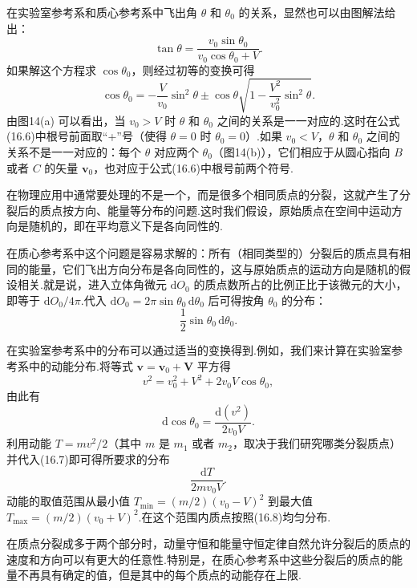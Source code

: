 在实验室参考系和质心参考系中飞出角 $\theta$ 和 $\theta_0$ 的关系，显然也可以由图解法给出：
\begin{equation}
  \tan\theta=\frac{v_0\sin\theta_0}{v_0\cos\theta_0+V}.
\end{equation}
如果解这个方程求 $\cos\theta_0$，则经过初等的变换可得
\begin{equation}
  \cos\theta_0=-\frac{V}{v_0}\sin^2\theta
  \pm\cos\theta\sqrt{1-\frac{V^2}{v_0^2}\sin^2\theta}.
\end{equation}
由图14(a) 可以看出，当 $v_0>V$ 时 $\theta$ 和 $\theta_0$ 之间的关系是一一对应的.这时在公式(16.6)中根号前面取“+”号（使得 $\theta=0$ 时 $\theta_0=0$）.如果 $v_0<V$，$\theta$ 和 $\theta_0$ 之间的关系不是一一对应的：每个 $\theta$ 对应两个 $\theta_0$（图14(b)），它们相应于从圆心指向 $B$ 或者 $C$ 的矢量 $\boldsymbol{v}_0$，也对应于公式(16.6)中根号前两个符号.

在物理应用中通常要处理的不是一个，而是很多个相同质点的分裂，这就产生了分裂后的质点按方向、能量等分布的问题.这时我们假设，原始质点在空间中运动方向是随机的，即在平均意义下是各向同性的.

在质心参考系中这个问题是容易求解的：所有（相同类型的）分裂后的质点具有相同的能量，它们飞出方向分布是各向同性的，这与原始质点的运动方向是随机的假设相关.就是说，进入立体角微元 $\mathrm{d}O_0$ 的质点数所占的比例正比于该微元的大小，即等于 $\mathrm{d}O_0/4\pi$.代入 $\mathrm{d}O_0=2\pi\sin\theta_0\,\mathrm{d}\theta_0$ 后可得按角 $\theta_0$ 的分布：
\begin{equation}
  \frac{1}{2}\sin\theta_0\,\mathrm{d}\theta_0.
\end{equation}

在实验室参考系中的分布可以通过适当的变换得到.例如，我们来计算在实验室参考系中的动能分布.将等式 $\boldsymbol{v}=\boldsymbol{v}_0+\boldsymbol{V}$ 平方得
\begin{equation*}
  v^2=v_0^2+V^2+2v_0V\cos\theta_0,
\end{equation*}
由此有
\begin{equation*}
  \mathrm{d}\cos\theta_0=\frac{\mathrm{d}(v^2)}{2v_0V}.
\end{equation*}
利用动能 $T=mv^2/2$（其中 $m$ 是 $m_1$ 或者 $m_2$，取决于我们研究哪类分裂质点）并代入(16.7)即可得所要求的分布
\begin{equation}
  \frac{\mathrm{d}T}{2mv_0V}.
\end{equation}
动能的取值范围从最小值 $T_\mathrm{min}=(m/2)(v_0-V)^2$ 到最大值 $T_\mathrm{max}=(m/2)(v_0+V)^2$.在这个范围内质点按照(16.8)均匀分布.

在质点分裂成多于两个部分时，动量守恒和能量守恒定律自然允许分裂后的质点的速度和方向可以有更大的任意性.特别是，在质心参考系中这些分裂后的质点的能量不再具有确定的值，但是其中的每个质点的动能存在上限.

